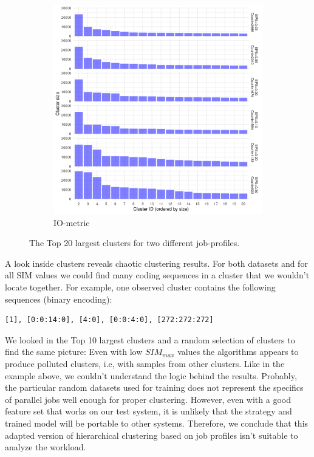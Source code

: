\documentclass[]{llncs}
\makeatletter
\newcommand{\jk}[1]{\todo[inline]{JK:\@#1}}
\makeatother
\begin{document}
\begin{figure}
\begin{subfigure}[t]{0.45\textwidth}
	\includegraphics[width=\textwidth]{./media/image12.png}
	\caption{IO-metric}
	\label{fig:datasets_clustering_results:io_metric}
 \end{subfigure}
 \caption{The Top 20 largest clusters for two different job-profiles.}
 \label{fig:datasets_clustering_results}
\end{figure}

A look inside clusters reveals chaotic clustering results.
For both datasets and for all SIM values we could find many coding sequences in a cluster that we wouldn't locate together.
For example, one observed cluster contains the following sequences (binary encoding):
\begin{lstlisting}
[1], [0:0:14:0], [4:0], [0:0:4:0], [272:272:272]
\end{lstlisting}

We looked in the Top 10 largest clusters and a random selection of clusters to find the same picture:
Even with low $SIM_{max}$ values the algorithms appears to produce polluted clusters, i.e, with samples from other clusters.
\jk{Warum sim max hier}
Like in the example above, we couldn't understand the logic behind the results.
Probably, the particular random datasets used for training does not represent the specifics of parallel jobs  well enough for proper clustering.
However, even with a good feature set that works on our test system, it is unlikely that the strategy and trained model will be portable to other systems.
Therefore, we conclude that this adapted version of hierarchical clustering based on job profiles isn't suitable to analyze the workload.
\end{document}

